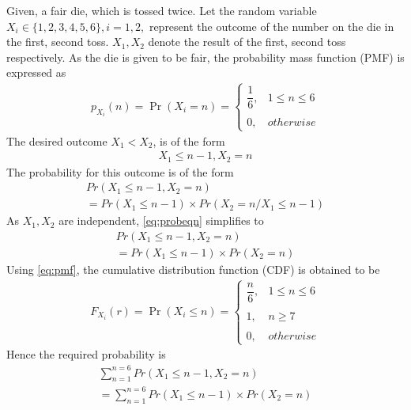 \documentclass[journal,12pt,twocolumn]{IEEEtran}
\begin{document}
Given, a fair die, which is tossed twice. Let the random variable $X_{i}\in\{1,2,3,4,5,6\},i=1,2,$ represent the outcome of the number on the die in the first, second toss. $X_{1},X_{2}$ denote the result of the first, second toss respectively.
\newline
\newline
As the die is given to be fair, the probability  mass function (PMF) is expressed as \begin{align}
    \tag{26.1}
    p_{X_{i}}(n)=\Pr(X_{i}=n) = 
	\begin{cases}
	\dfrac{1}{6}, & 1\leq n\leq6 \\~\\[-1em]
	0, & otherwise
	\end{cases}
	\label{eq:pmf}
\end{align}
\newline
The desired outcome $X_{1}<X_{2}$, is of the form
\begin{align}
    \tag{26.2}
    X_{1}\leq n-1,X_{2}=n
\end{align}
The probability for this outcome is of the form
\begin{multline}
    \tag{26.3}
    Pr(X_{1}\leq n-1,X_{2}=n)\\=Pr(X_{1}\leq n-1) \times Pr(X_{2}=n/X_{1}\leq n-1)
    \label{eq:probeqn}
\end{multline}
As $X_{1},X_{2}$ are independent, \eqref{eq:probeqn} simplifies to
\begin{multline}
    \tag{26.4}
    Pr(X_{1}\leq n-1,X_{2}=n)\\=Pr(X_{1}\leq n-1) \times Pr(X_{2}=n)
\end{multline}
Using \eqref{eq:pmf}, the cumulative distribution function (CDF) is obtained to be
\begin{align}
    \tag{26.5}
    F_{X_{i}}(r)=\Pr(X_{i}\leq n) = 
	\begin{cases}
	\dfrac{n}{6}, & 1\leq n\leq6 \\~\\[-1em]
	1, & n \geq 7 \\~\\[-1em]
	0, & otherwise
	\end{cases}
	\label{eq:26.5}
\end{align}
\newline
Hence the required probability is
\begin{multline}
    \tag{26.6}
    \sum_{n=1}^{n=6}Pr(X_{1}\leq n-1,X_{2}=n)\\=\sum_{n=1}^{n=6}Pr(X_{1}\leq n-1) \times Pr(X_{2}=n)
\end{multline}
\end{document}
